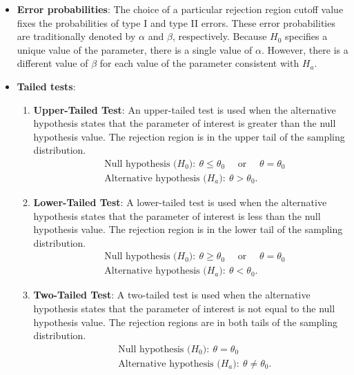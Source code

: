\documentclass{report}
\begin{document}
\begin{itemize}
\item \textbf{Error probabilities}:
    The choice of a particular rejection region cutoff value fixes the probabilities of type I and type II errors. These error probabilities are traditionally denoted by \( \alpha \) and \( \beta \), respectively. Because \( H_0 \) specifies a unique value of the parameter, there is a single value of \( \alpha \). However, there is a different value of \( \beta \) for each value of the parameter consistent with \( H_a \).
\item \textbf{Tailed tests}:
    \begin{enumerate}
        \item \textbf{Upper-Tailed Test}: An upper-tailed test is used when the alternative hypothesis states that the parameter of interest is greater than the null hypothesis value. The rejection region is in the upper tail of the sampling distribution.
            \begin{align*}
                &\text{Null hypothesis ($H_{0}$)}:\ \theta \leq \theta_{0} \quad \text{ or } \quad \theta  = \theta_{0} \\
                &\text{Alternative hypothesis ($H_{a}$)}:\ \theta > \theta_{0} 
            .\end{align*}
        \item \textbf{Lower-Tailed Test}: A lower-tailed test is used when the alternative hypothesis states that the parameter of interest is less than the null hypothesis value. The rejection region is in the lower tail of the sampling distribution.
            \begin{align*}
                &\text{Null hypothesis ($H_{0}$)}:\ \theta \geq \theta_{0} \quad \text{ or } \quad \theta  = \theta_{0} \\
                &\text{Alternative hypothesis ($H_{a}$)}:\ \theta < \theta_{0} 
            .\end{align*}
        \item \textbf{Two-Tailed Test}:
            A two-tailed test is used when the alternative hypothesis states that the parameter of interest is not equal to the null hypothesis value. The rejection regions are in both tails of the sampling distribution.
            \begin{align*}
                &\text{Null hypothesis ($H_{0}$)}:\ \theta  = \theta_{0} \\
                &\text{Alternative hypothesis ($H_{a}$)}:\ \theta \ne \theta_{0} 
            .\end{align*}

\end{enumerate}
\end{itemize}
\end{document}
